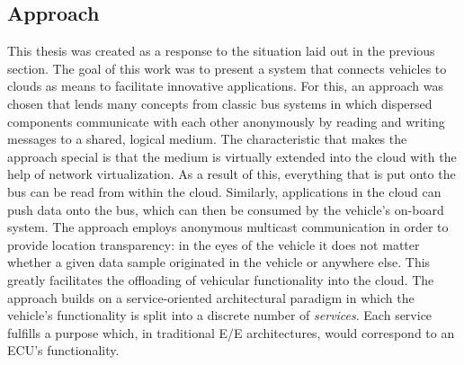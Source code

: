 \subsection{Approach}
This thesis was created as a response to the situation laid out in the previous section. The goal of this work was to present a system that connects vehicles to clouds as means to facilitate innovative applications. For this, an approach was chosen that lends many concepts from classic bus systems in which dispersed components communicate with each other anonymously by reading and writing messages to a shared, logical medium. The characteristic that makes the approach special is that the medium is virtually extended into the cloud with the help of network virtualization. As a result of this, everything that is put onto the bus can be read from within the cloud. Similarly, applications in the cloud can push data onto the bus, which can then be consumed by the vehicle's on-board system. The approach employs anonymous multicast communication in order to provide location transparency: in the eyes of the vehicle it does not matter whether a given data sample originated in the vehicle or anywhere else. This greatly facilitates the offloading of vehicular functionality into the cloud. The approach builds on a service-oriented architectural paradigm in which the vehicle's functionality is split into a discrete number of \emph{services}. Each service fulfills a purpose which, in traditional E/E architectures, would correspond to an ECU's functionality.

